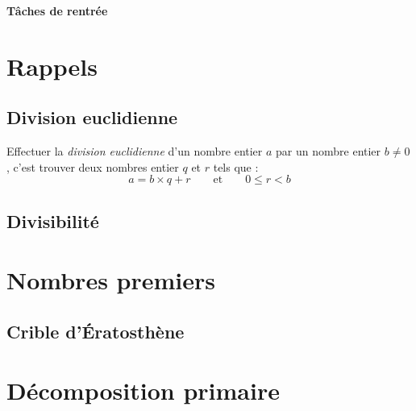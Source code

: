 \documentclass[11pt]{article}
\begin{document}
\begin{tcolorbox}[colback=teal!10!white, colframe=teal!80!black]
\begin{center}
\large\textbf{Tâches de rentrée}
\end{center}
\end{tcolorbox}

\section{Rappels}

\subsection{Division euclidienne}

Effectuer la \emph{division euclidienne} d’un nombre entier $a$ par un nombre entier $b \neq 0$, c’est trouver deux nombres entier $q$ et $r$ tels que :
\[
a = b \times q + r \qquad \textrm{et} \qquad 0 \leq r < b
\]

\subsection{Divisibilité}

\section{Nombres premiers}
\subsection{Crible d’Ératosthène}

\section{Décomposition primaire}
\end{document}
